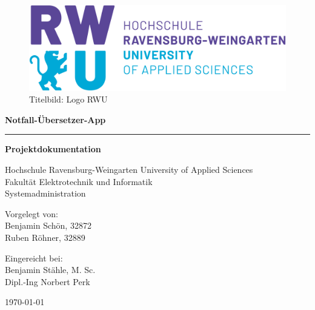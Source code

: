 

\begin{titlepage}
    \begin{center}
        \begin{figure}[h]
            \includegraphics[scale=0.4, center]{resources/titleImage_rwu.png}
            \caption[Titelbild: Logo RWU]{Titelbild: Logo RWU}
        \end{figure}
        
        \vspace{20pt}
        
        \begin{LARGE}		
            \bf{Notfall-Übersetzer-App\\}
            \noindent\rule[1ex]{20pt}{1pt}
            \linebreak
            \bf{Projektdokumentation\\}
		\end{LARGE}
  
		\vspace{40pt}
        \large
        Hochschule Ravensburg-Weingarten University of Applied Sciences\\
        Fakultät Elektrotechnik und Informatik\\
        Systemadministration\\
        
		\vspace{40pt}

        Vorgelegt von:\\
        \vspace{5pt}
        Benjamin Schön, 32872\\
        Ruben Röhner, 32889\\

        \vspace{30pt}

        Eingereicht bei:\\
        \vspace{5pt}
        Benjamin Stähle, M. Sc.\\
        Dipl.-Ing Norbert Perk\\

        \vspace{40pt}

        \today\\
    \end{center} 
\end{titlepage}
